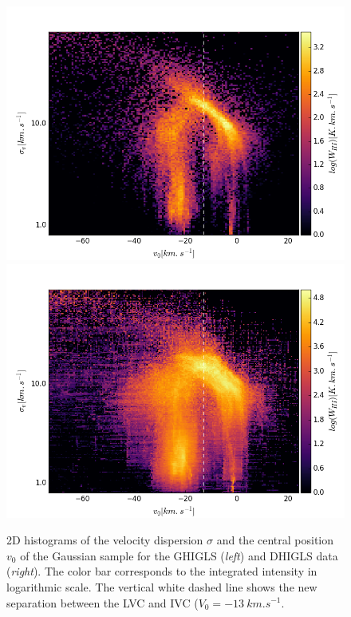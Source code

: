 \documentclass[traditabstract]{aa}
\begin{document}
\begin{figure}
  \centering
  \includegraphics[width=0.48\linewidth,trim=15 0 30 40,clip=true]{Figures/2Dhisto_GHIGLS.png}
  \includegraphics[width=0.48\linewidth,trim=15 0 30 40,clip=true]{Figures/2Dhisto_DHIGLS.png}
  \caption{\label{2Dhisto} 2D histograms of the velocity dispersion $\sigma$ and the central position $v_0$ of the Gaussian sample for the GHIGLS (\emph{left}) and DHIGLS data (\emph{right}). The color bar corresponds to the integrated intensity in logarithmic scale. The vertical white dashed line shows the new separation between the LVC and IVC ($V_0=-13\: km.s^{-1}$.}
\end{figure}
\end{document}
